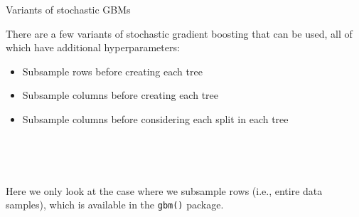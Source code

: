 \documentclass[
  10pt,
  ignorenonframetext,
]{beamer}
\providecommand{\tightlist}{%
  \setlength{\itemsep}{0pt}\setlength{\parskip}{0pt}}
\begin{document}
\begin{frame}[fragile]
\begin{block}{Variants of stochastic GBMs}
\protect\hypertarget{variants-of-stochastic-gbms}{}
\(~\)

There are a few variants of stochastic gradient boosting that can be
used, all of which have additional hyperparameters:

\vspace{2mm}

\begin{itemize}
\tightlist
\item
  Subsample rows before creating each tree
\end{itemize}

\vspace{2mm}

\begin{itemize}
\tightlist
\item
  Subsample columns before creating each tree
\end{itemize}

\vspace{2mm}

\begin{itemize}
\tightlist
\item
  Subsample columns before considering each split in each tree
\end{itemize}

\(~\)

\(~\)

Here we only look at the case where we subsample rows (i.e., entire data
samples), which is available in the \texttt{gbm()} package.
\end{block}
\end{frame}
\end{document}
